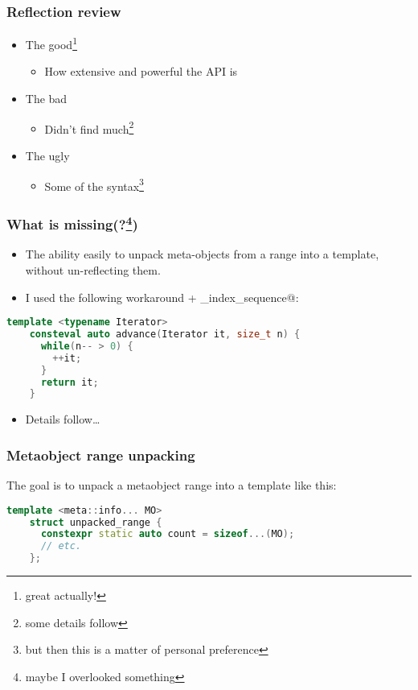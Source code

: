 \documentclass[compress,table,xcolor=table]{beamer}
\begin{document}
\begin{frame}
  \frametitle{Reflection review}
    \Huge
    \begin{itemize}
    \item{The good\footnote{great actually!}}
        \begin{itemize}
        \Large
        \item{How extensive and powerful the API is}
        \end{itemize}
    \item{The bad}
        \begin{itemize}
        \Large
        \item{Didn't find much\footnote{some details follow}}
        \end{itemize}
    \item{The ugly}
        \begin{itemize}
        \Large
        \item{Some of the syntax\footnote{but then this is a matter of personal preference}}
        \end{itemize}
    \end{itemize}
\end{frame}
\begin{frame}[fragile]
\frametitle{What is missing(?\footnote{maybe I overlooked something})}
    \Large
    \begin{itemize}
    \item The ability easily to unpack meta-objects from a range into a template,
        without un-reflecting them.
    \item I used the following workaround + \verb@make_index_sequence@:
    \end{itemize}
    \begin{lstlisting}[language=c++]
    template <typename Iterator>
    consteval auto advance(Iterator it, size_t n) {
      while(n-- > 0) {
        ++it;
      }
      return it;
    }
    \end{lstlisting}
    \begin{itemize}
    \item Details follow\ldots
    \end{itemize}
\end{frame}
\begin{frame}[fragile]
\frametitle{Metaobject range unpacking}
  \Large
  The goal is to unpack a metaobject range into a template like this:
    \begin{lstlisting}[language=c++]
    template <meta::info... MO>
    struct unpacked_range {
      constexpr static auto count = sizeof...(MO);
      // etc.
    };
    \end{lstlisting}
\end{frame}
\end{document}
